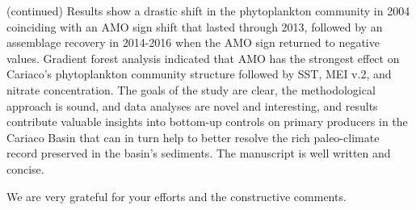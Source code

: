 \documentclass[12pt,english]{reviewresponse}
\begin{document}
\begin{generalcomment} (continued) 
Results show a drastic shift in the phytoplankton community in 2004 coinciding with an AMO sign shift that lasted through 2013, followed by an assemblage recovery in 2014-2016 when the AMO sign returned to negative values. Gradient forest analysis indicated that AMO has the strongest effect on Cariaco's phytoplankton community structure followed by SST, MEI v.2, and nitrate concentration. The goals of the study are clear, the methodological approach is sound, and data analyses are novel and interesting, and results contribute valuable insights into bottom-up controls on primary producers in the Cariaco Basin that can in turn help to better resolve the rich paleo-climate record preserved in the basin's sediments. The manuscript is well written and concise.
\end{generalcomment}

\begin{revresponse}
	We are very grateful for your efforts and the constructive comments.
\end{revresponse}
\end{document}
